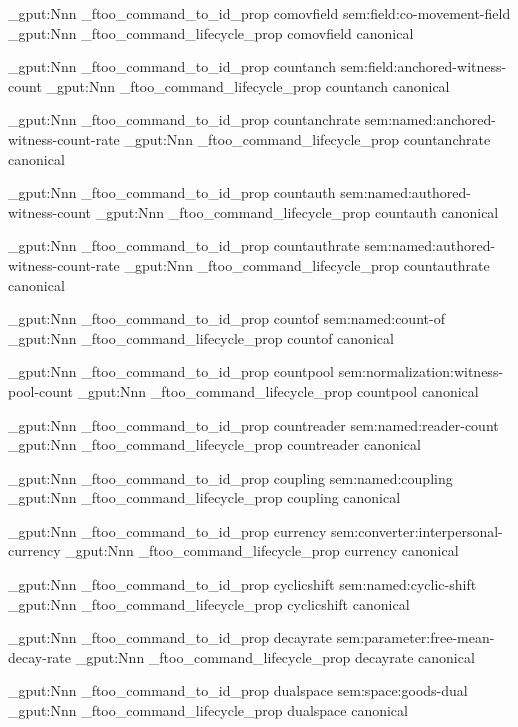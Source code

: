 \prop_gput:Nnn \g_ftoo_command_to_id_prop { comovfield } { sem:field:co-movement-field }
\prop_gput:Nnn \g_ftoo_command_lifecycle_prop { comovfield } { canonical }


\prop_gput:Nnn \g_ftoo_command_to_id_prop { countanch } { sem:field:anchored-witness-count }
\prop_gput:Nnn \g_ftoo_command_lifecycle_prop { countanch } { canonical }


\prop_gput:Nnn \g_ftoo_command_to_id_prop { countanchrate } { sem:named:anchored-witness-count-rate }
\prop_gput:Nnn \g_ftoo_command_lifecycle_prop { countanchrate } { canonical }


\prop_gput:Nnn \g_ftoo_command_to_id_prop { countauth } { sem:named:authored-witness-count }
\prop_gput:Nnn \g_ftoo_command_lifecycle_prop { countauth } { canonical }


\prop_gput:Nnn \g_ftoo_command_to_id_prop { countauthrate } { sem:named:authored-witness-count-rate }
\prop_gput:Nnn \g_ftoo_command_lifecycle_prop { countauthrate } { canonical }


\prop_gput:Nnn \g_ftoo_command_to_id_prop { countof } { sem:named:count-of }
\prop_gput:Nnn \g_ftoo_command_lifecycle_prop { countof } { canonical }


\prop_gput:Nnn \g_ftoo_command_to_id_prop { countpool } { sem:normalization:witness-pool-count }
\prop_gput:Nnn \g_ftoo_command_lifecycle_prop { countpool } { canonical }


\prop_gput:Nnn \g_ftoo_command_to_id_prop { countreader } { sem:named:reader-count }
\prop_gput:Nnn \g_ftoo_command_lifecycle_prop { countreader } { canonical }


\prop_gput:Nnn \g_ftoo_command_to_id_prop { coupling } { sem:named:coupling }
\prop_gput:Nnn \g_ftoo_command_lifecycle_prop { coupling } { canonical }


\prop_gput:Nnn \g_ftoo_command_to_id_prop { currency } { sem:converter:interpersonal-currency }
\prop_gput:Nnn \g_ftoo_command_lifecycle_prop { currency } { canonical }


\prop_gput:Nnn \g_ftoo_command_to_id_prop { cyclicshift } { sem:named:cyclic-shift }
\prop_gput:Nnn \g_ftoo_command_lifecycle_prop { cyclicshift } { canonical }


\prop_gput:Nnn \g_ftoo_command_to_id_prop { decayrate } { sem:parameter:free-mean-decay-rate }
\prop_gput:Nnn \g_ftoo_command_lifecycle_prop { decayrate } { canonical }


\prop_gput:Nnn \g_ftoo_command_to_id_prop { dualspace } { sem:space:goods-dual }
\prop_gput:Nnn \g_ftoo_command_lifecycle_prop { dualspace } { canonical }


